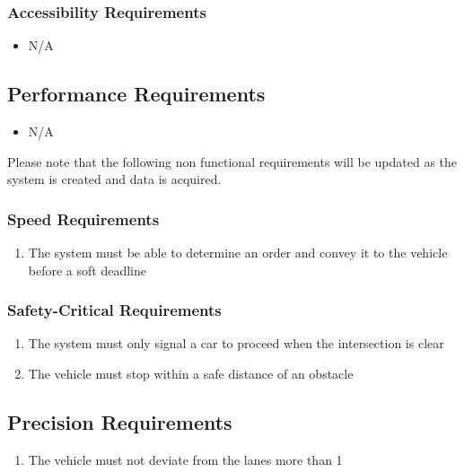 \documentclass [12pt]{article}
\begin{document}
\subsubsection{Accessibility Requirements }
	\begin{itemize}
		\item N/A
	\end{itemize}
 
\subsection{\large Performance Requirements}
	\begin{itemize}
		\item N/A
	\end{itemize}
	Please note that the following  non functional requirements will be updated as the system is created and data is acquired.

\subsubsection{Speed Requirements }
	\begin{enumerate}[label=\textbf{\Alph*}:]
		\item The system must be able to determine an order and convey it to the vehicle before a soft deadline
	\end{enumerate}

\subsubsection{Safety-Critical Requirements }
	\begin{enumerate}[label=\textbf{\Alph*}:]
		\item The system must only signal a car to proceed when the intersection is clear
		\item The vehicle must stop within a safe distance of an obstacle
	\end{enumerate}	

\subsection{\large Precision Requirements}
	\begin{enumerate}[label=\textbf{\Alph*}:]
		\item The vehicle must not deviate from the lanes more than 1%
	\end{enumerate}
\end{document}
